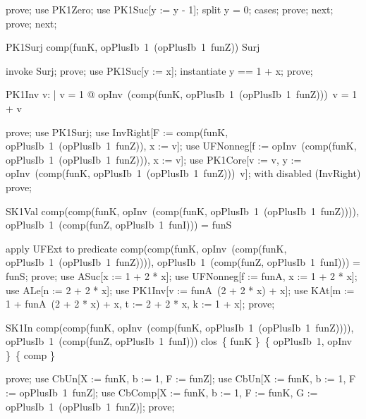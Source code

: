\documentclass{article}
\begin{document}
\begin{zproof}
prove;
use PK1Zero;
use PK1Suc[y := y - 1];
split y = 0;
cases;
prove;
next;
prove;
next;
\end{zproof}

\begin{theorem}{PK1Surj}
  comp(funK, opPlusIb~1~(opPlusIb~1~funZ)) \in Surj
\end{theorem}

\begin{zproof}
invoke Surj;
prove;
use PK1Suc[y := x];
instantiate y == 1 + x;
prove;
\end{zproof}

\begin{theorem}{PK1Inv}
  \forall v: \nat | \lnot v = 1 @ opInv~(comp(funK, opPlusIb~1~(opPlusIb~1~funZ)))~v = 1 + v
\end{theorem}

\begin{zproof}
prove;
use PK1Surj;
use InvRight[F := comp(funK, opPlusIb~1~(opPlusIb~1~funZ)), x := v];
use UFNonneg[f := opInv~(comp(funK, opPlusIb~1~(opPlusIb~1~funZ))), x := v];
use PK1Core[v := v, y := opInv~(comp(funK, opPlusIb~1~(opPlusIb~1~funZ)))~v];
with disabled (InvRight) prove;
\end{zproof}

\begin{theorem}{SK1Val}
  comp(comp(funK, opInv~(comp(funK, opPlusIb~1~(opPlusIb~1~funZ)))), opPlusIb~1~(comp(funZ, opPlusIb~1~funI))) = funS
\end{theorem}

\begin{zproof}
apply UFExt to predicate comp(comp(funK, opInv~(comp(funK, opPlusIb~1~(opPlusIb~1~funZ)))), opPlusIb~1~(comp(funZ, opPlusIb~1~funI))) = funS;
prove;
use ASuc[x := 1 + 2 * x];
use UFNonneg[f := funA, x := 1 + 2 * x];
use ALe[n := 2 + 2 * x];
use PK1Inv[v := funA~(2 + 2 * x) + x];
use KAt[m := 1 + funA~(2 + 2 * x) + x, t := 2 + 2 * x, k := 1 + x];
prove;
\end{zproof}

\begin{theorem}{SK1In}
  comp(comp(funK, opInv~(comp(funK, opPlusIb~1~(opPlusIb~1~funZ)))), opPlusIb~1~(comp(funZ, opPlusIb~1~funI))) \in clos~\{ funK \}~\{ opPlusIb~1, opInv \}~\{ comp \}
\end{theorem}

\begin{zproof}
prove;
use CbUn[X := funK, b := 1, F := funZ];
use CbUn[X := funK, b := 1, F := opPlusIb~1~funZ];
use CbComp[X := funK, b := 1, F := funK, G := opPlusIb~1~(opPlusIb~1~funZ)];
prove;
\end{zproof}
\end{document}
